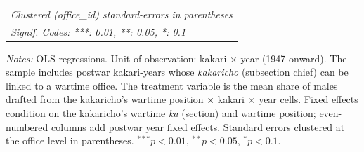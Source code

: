 \begin{table}[htbp]
\begin{threeparttable}
{\begin{tabular}{lcccccc}
   \midrule \midrule
   \multicolumn{7}{l}{\emph{Clustered (office\_id) standard-errors in parentheses}}\\
   \multicolumn{7}{l}{\emph{Signif. Codes: ***: 0.01, **: 0.05, *: 0.1}}\\
\end{tabular}
}
\begin{tablenotes}[flushleft]
\footnotesize
\item \textit{Notes:} OLS regressions. Unit of observation: kakari $\times$ year (1947 onward). The sample includes postwar kakari-years whose \emph{kakaricho} (subsection chief) can be linked to a wartime office. The treatment variable is the mean share of males drafted from the kakaricho's wartime position $\times$ kakari $\times$ year cells. Fixed effects condition on the kakaricho's wartime \emph{ka} (section) and wartime position; even-numbered columns add postwar year fixed effects. Standard errors clustered at the office level in parentheses. $^{***}p<0.01$, $^{**}p<0.05$, $^{*}p<0.1$.
\end{tablenotes}
\end{threeparttable}
\end{table}
